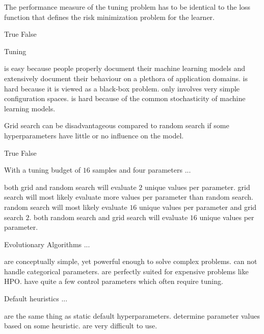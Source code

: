 \documentclass{exam}
\begin{document}
\begin{questions}
		\question The performance measure of the tuning problem has to be  identical to the loss function that defines the risk minimization problem for the learner.
		\begin{choices}
			\choice True
			\choice False %
		\end{choices}
		
		\question Tuning
		\begin{choices}
			\choice is easy because people properly document their machine learning models and extensively document their behaviour on a plethora of application domains.
			\choice is hard because it is viewed as a black-box problem. %
			\choice only involves very simple configuration spaces.
			\choice is hard because of the common stochasticity of machine learning models. %
		\end{choices}
		
		\question Grid search can be disadvantageous compared to random search if
		some hyperparameters have little or no
		influence on the model.
		\begin{choices}
			\choice True
			\choice False
		\end{choices}
		
		\question With a tuning budget of $16$ samples and four parameters ...
		\begin{choices}
			\choice both grid and random search will evaluate $2$ unique values per parameter.
			\choice grid search will most likely evaluate more values per parameter than random search.
			\choice random search will most likely evaluate $16$ unique values per parameter and grid search $2$. %
			\choice both random search and grid search will evaluate $16$ unique values per parameter.
		\end{choices}
		
		\question Evolutionary Algorithms ...
		\begin{choices}
			\choice are conceptually simple, yet powerful enough to solve complex problems. %
			\choice can not handle categorical parameters.
			\choice are perfectly suited for expensive problems like HPO.
			\choice have quite a few control parameters which often require tuning. %
		\end{choices}
		
		\question Default heuristics ...
		\begin{choices}
			\choice are the same thing as static default hyperparameters.
			\choice determine parameter values based on some heuristic. %
			\choice are very difficult to use.
		\end{choices}
		

\end{questions}
\end{document}
